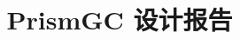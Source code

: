 \documentclass{xDocument}
\begin{document}
\title{PrismGC 设计报告}



\pagestyle{fancy}


\clearpage

\tableofcontents
\clearpage


\clearpage

\clearpage

\clearpage

\clearpage
\appendix

\end{document}
